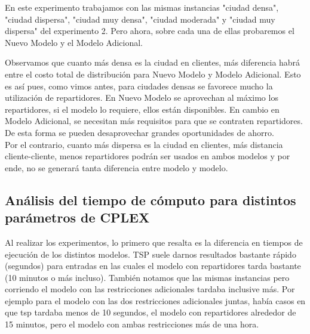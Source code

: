 \documentclass{article}
\begin{document}
    En este experimento trabajamos con las mismas instancias "ciudad densa", "ciudad dispersa", "ciudad muy densa", "ciudad moderada" y "ciudad muy dispersa" del experimento 2. Pero ahora, sobre cada una de ellas probaremos el Nuevo Modelo y el Modelo Adicional. 
    
    \begin{table}[H]
    \centering
    \caption{Comparación de costos entre metodologías para distintas densidades de clientes por $km^{2}$}
    \end{table}
    
    Observamos que cuanto más densa es la ciudad en clientes, más diferencia habrá entre el costo total de distribución para Nuevo Modelo y Modelo Adicional. Esto es así pues, como vimos antes, para ciudades densas se favorece mucho la utilización de repartidores. En Nuevo Modelo se aprovechan al máximo los repartidores, si el modelo lo requiere, ellos están disponibles. En cambio en Modelo Adicional, se necesitan más requisitos para que se contraten repartidores. De esta forma se pueden desaprovechar grandes oportunidades de ahorro. \\
    Por el contrario, cuanto más dispersa es la ciudad en clientes, más distancia cliente-cliente, menos repartidores podrán ser usados en ambos modelos y por ende, no se generará tanta diferencia entre modelo y modelo. 
    
    \subsection{Análisis del tiempo de cómputo para distintos parámetros de CPLEX}

    Al realizar los experimentos, lo primero que resalta es la diferencia en tiempos de ejecución de los distintos modelos. TSP suele darnos resultados bastante rápido (segundos) para entradas en las cuales el modelo con repartidores tarda bastante (10 minutos o más incluso). También notamos que las mismas instancias pero corriendo el modelo con las restricciones adicionales tardaba inclusive más. Por ejemplo para el modelo con las dos restricciones adicionales juntas, había casos en que tsp tardaba menos de 10 segundos, el modelo con repartidores alrededor de 15 minutos, pero el modelo con ambas restricciones más de una hora.
\end{document}
